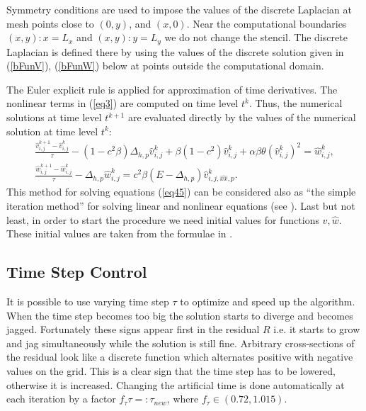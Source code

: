 \documentclass[preprint]{elsarticle}
\newcommand{\rf}[1]{(\ref{#1})}
\begin{document}
Symmetry conditions are used to impose the values of the discrete Laplacian at mesh points close to ${(0,y)}$, and $(x,0)$. 
Near  the computational boundaries $(x,y):x=L_x$ and $(x,y):y=L_y$ we do not change the stencil. The discrete Laplacian
is defined  there by using the values of the discrete solution given in \rf{bFunV}, \rf{bFunW} below at  points outside the computational domain.

\par
The Euler explicit rule is applied for approximation of  time derivatives. The nonlinear terms in \rf{eq3} are computed on    time level $t^k$. Thus, the numerical solutions at time level $t^{k+1}$ are evaluated directly by the values of the numerical solution at time level $t^k$:  
 \begin{equation}\label{eq55}
 \begin{split}
   \frac {\widehat{v}_{i,j}^{k+1}-\widehat{v}_{i,j}^{k}}{\tau}- (1-c^2 \beta) \Delta_{h,p} \widehat{v} _{i,j}^{k}+ \beta (1-c^2     ) \widehat{v}_{i,j}^{k} + \alpha \beta \theta (\widehat{v}_{i,j}^{k})^2 = \widehat{w}_{i,j}^{k}, \\
  \frac  {\widehat{w}_{i,j}^{k+1} -\widehat{w}_{i,j}^{k}} {\tau} - \Delta_{h,p} \widehat{w}_{i,j}^{k} =  c^2 \beta (E- \Delta_{h,p})       
    \widehat{v}_{i,j,{\widehat{xx},p}}^{k}. \;\;\;\; \;\;\;\;\;\;\;\;\;\;\;\;
\end{split}
\end{equation}
This method for solving equations 
\rf{eq45} can be considered also as ``the simple iteration method'' for solving linear and nonlinear equations (see \cite{sam}).
Last but not least, in order to start the procedure we need initial values for functions $\widehat{v},\widehat{w}$. These initial values are taken from the formulae in \cite{Ch2011}.

\subsection{Time Step Control}
It is possible to use varying time step $\tau$ to optimize and speed up the algorithm. When the time step becomes too big the solution starts to diverge and becomes jagged. Fortunately these signs appear first in the residual $R$ i.e. it
starts to grow and jag simultaneously while the solution is still fine. 
Arbitrary cross-sections of the residual look like a discrete function
which alternates positive with negative values on the grid.
This is a clear sign that the time step has to be lowered, otherwise it is increased. Changing the artificial time is done automatically at each iteration by a factor $f_{\tau}\tau =: \tau_{new}$, where $f_{\tau} \in (0.72, 1.015)$. 
\end{document}

